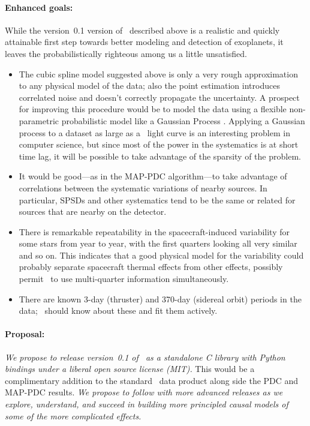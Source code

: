 \documentclass[letterpaper,12pt,preprint]{hack_aastex}
\newcommand{\Untrendy}{\package{Untrendy}}
\begin{document}
\paragraph{Enhanced goals:}
While the version~0.1 version of \Untrendy\ described above is a realistic and
quickly attainable first step towards better modeling and detection of
exoplanets, it leaves the probabilistically
righteous among us a little unsatisfied.
\begin{itemize}
\item
The cubic spline model suggested above is only a very rough approximation to
any physical model of the data; also the point estimation introduces
correlated noise and doesn't
correctly propagate the uncertainty.
A prospect for improving this procedure would be to model the data
using a flexible non-parametric probabilistic model like a Gaussian Process
 \citep{gp}.
Applying a Gaussian process to a dataset as large as a \Kepler\ light curve is
an interesting problem in computer science, but since most of the power in the
systematics is at short time lag, it will be possible to take advantage of
the sparsity of the problem.
\item
It would be good---as in the MAP-PDC
algorithm---to take advantage of correlations between the systematic
variations of nearby sources.
In particular, SPSDs and other
systematics tend to be the same or related for sources that are nearby
on the detector.
\item
There is remarkable repeatability in the spacecraft-induced
variability for some stars from year to year, with the
first quarters looking all very similar and so on.
This indicates that a good physical model for the variability could probably
separate spacecraft thermal effects from other effects, possibly
permit \Untrendy\ to use multi-quarter information simultaneously.
\item
There are known 3-day (thruster) and 370-day (sidereal orbit) periods
in the data; \Untrendy\ should know about these and fit them actively.
\end{itemize}

\paragraph{Proposal:}
\emph{We propose to release version~0.1 of \Untrendy\ as a standalone C
library with Python bindings under a liberal open source license (MIT).}
This would be a complimentary addition to the standard \Kepler\ data
product along side the PDC and MAP-PDC results.
\emph{We propose to follow with more advanced releases as we explore,
understand, and succeed in building more principled causal models of some
of the more complicated effects.}
\end{document}
